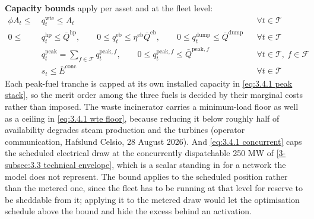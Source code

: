 \textbf{Capacity bounds} apply per asset and at the fleet level:
\begin{align}
    \phi A_t \leq &\ q^{\text{wte}}_t \leq A_t && \forall t \in \mathcal{T} \label{eq:3.4.1 wte floor} \\
    0 \leq &\ q^{\text{hp}}_t \leq \bar{Q}^{\text{hp}}, \qquad 0 \leq q^{\text{eb}}_t \leq \eta^{\text{eb}} \bar{Q}^{\text{eb}}, \qquad 0 \leq q^{\text{dump}}_t \leq \bar{Q}^{\text{dump}} && \forall t \in \mathcal{T} \label{eq:3.4.1 asset caps} \\
    &\ q^{\text{peak}}_t = \sum_{f \in \mathcal{F}} q^{\text{peak},f}_t, \qquad 0 \leq q^{\text{peak},f}_t \leq \bar{Q}^{\text{peak},f} && \forall t \in \mathcal{T},\ f \in \mathcal{F} \label{eq:3.4.1 peak stack} \\
    &\ s_t \leq \bar{E}^{\text{conc}} && \forall t \in \mathcal{T} \label{eq:3.4.1 concurrent}
\end{align}
Each peak-fuel tranche is capped at its own installed capacity in \autoref{eq:3.4.1 peak stack}, so the merit order among the three fuels is decided by their marginal costs rather than imposed. The waste incinerator carries a minimum-load floor as well as a ceiling in \autoref{eq:3.4.1 wte floor}, because reducing it below roughly half of availability degrades steam production and the turbines (operator communication, Hafslund Celsio, 28 August 2026). And \autoref{eq:3.4.1 concurrent} caps the scheduled electrical draw at the concurrently dispatchable 250 MW of \autoref{3-subsec:3.3 technical envelope}, which is a scalar standing in for a network the model does not represent. The bound applies to the scheduled position rather than the metered one, since the fleet has to be running at that level for reserve to be sheddable from it; applying it to the metered draw would let the optimisation schedule above the bound and hide the excess behind an activation.

